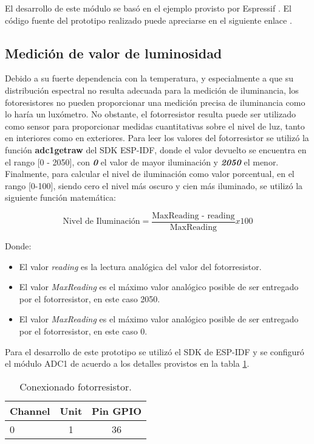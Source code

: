 El desarrollo de este módulo se basó en el ejemplo provisto por Espressif \cite{ESP32_ADC1_Example}. El código fuente del prototipo realizado puede apreciarse en el siguiente enlace \cite{ESP32_POC_joystick}.


\subsection{Medición de valor de luminosidad}
Debido a su fuerte dependencia con la temperatura, y especialmente a que su distribución espectral no resulta adecuada para la medición de iluminancia, los fotoresistores no pueden proporcionar una medición precisa de iluminancia como lo haría un luxómetro. No obstante, el fotorresistor resulta puede ser utilizado como sensor para proporcionar medidas cuantitativas sobre el nivel de luz, tanto en interiores como en exteriores.
Para leer los valores del fotorresistor se utilizó la función \textbf{adc1\textunderscore get\textunderscore raw } del SDK ESP-IDF, donde el valor devuelto se encuentra en el rango [0 - 2050], con \textit{\textbf{0}} el valor de mayor iluminación y \textit{\textbf{2050}} el menor.
Finalmente, para calcular el nivel de iluminación como valor porcentual, en el rango [0-100], siendo cero el nivel más oscuro y cien más iluminado, se utilizó la siguiente función matemática:

\begin{equation*}
\mbox{Nivel de Iluminación}=\frac{\mbox{MaxReading - reading}}{\mbox{MaxReading}} x 100
\end{equation*}

Donde:
\begin{itemize}
	\item El valor \textit{reading} es la lectura analógica del valor del fotorresistor.
	\item El valor \textit{MaxReading} es el máximo valor analógico posible de ser entregado por el fotorresistor, en este caso 2050.
	\item El valor \textit{MaxReading} es el máximo valor analógico posible de ser entregado por el fotorresistor, en este caso 0.
\end{itemize}

Para el desarrollo de este prototipo se utilizó el SDK de ESP-IDF y se configuró el módulo ADC1 de acuerdo a los detalles provistos en la tabla \ref{tab:conexionado_fotoresistor}.

\vspace{0.5cm}
\begin{table}[h]
\centering
\caption[Conexionado fotoresistor]{Conexionado fotorresistor.}
\begin{tabular}{l c c}
\toprule
\textbf{Channel} & \textbf{Unit} & \textbf{Pin GPIO}\\
\midrule
0 & 1 & 36 \\
\bottomrule
\hline
\end{tabular}
\label{tab:conexionado_fotoresistor}
\end{table}


